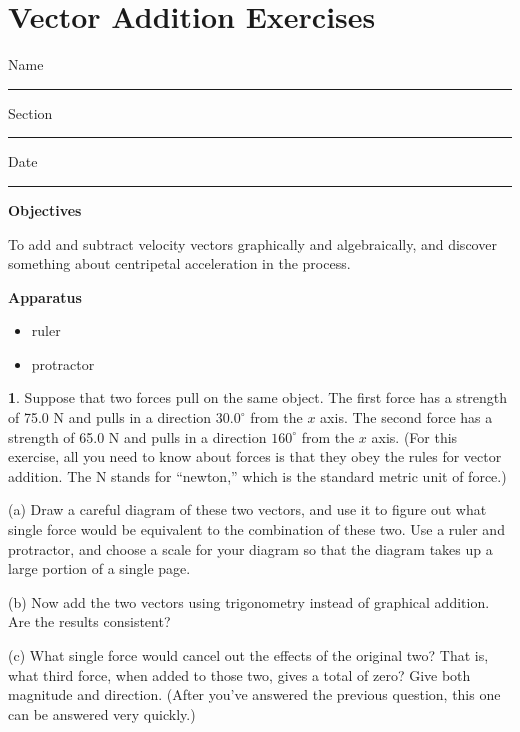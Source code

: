 
\section{Vector Addition Exercises}

Name \rule{2.0in}{0.1pt}\hfill{}Section \rule{1.0in}{0.1pt}\hfill{}Date \rule{1.0in}{0.1pt}

\textbf{Objectives}

To add and subtract velocity vectors graphically and algebraically, and discover something about centripetal acceleration in the process.


\textbf{Apparatus}
\begin{itemize} \itemsep1pt
\item ruler
\item protractor 
\end{itemize}

\bigskip

{\bf 1}.
Suppose that two forces pull on the same object.  The first force has
a strength of 75.0 N and pulls in a direction $30.0^\circ$ from the $x$
axis.  The second force has a strength of 65.0 N and pulls in a direction 
$160^\circ$ from the $x$ axis.  (For this exercise, all you need
to know about forces is that they obey the rules for vector addition.
The N stands for ``newton,'' which is the standard metric unit of force.)

(a) Draw a careful diagram of these two vectors, and use it to figure out
what single force would be equivalent to the combination of these two.
Use a ruler and protractor, and choose a scale for your diagram so that
the diagram takes up a large portion of a single page.

(b) Now add the two vectors using 
trigonometry instead
of graphical addition.  Are the results consistent?

\vfil\vfil

(c) What single force would cancel out the effects of the original two?  That
is, what third force, when added to those two, gives a total of zero?
Give both magnitude and direction.  (After you've answered the
previous question, this one can be answered very quickly.)

